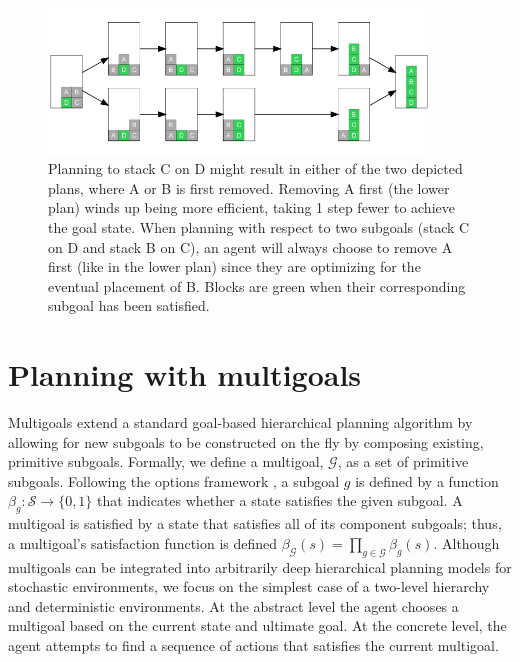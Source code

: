 \documentclass[10pt,letterpaper]{article}
\begin{document}
\begin{figure}[ht]
    \centering
    \includegraphics[width=0.9\textwidth]{example-4-block.png}
    \caption{Planning to stack C on D might result in either of the two depicted plans, where A or B is first removed. Removing A first (the lower plan) winds up being more efficient, taking 1 step fewer to achieve the goal state. When planning with respect to two subgoals (stack C on D and stack B on C), an agent will always choose to remove A first (like in the lower plan) since they are optimizing for the eventual placement of B. Blocks are green when their corresponding subgoal has been satisfied.}
\end{figure}



\section{Planning with multigoals}
\newcommand{\multigoal}{\mathcal{G}}

Multigoals extend a standard goal-based hierarchical planning algorithm by allowing for new subgoals to be constructed on the fly by composing existing, primitive subgoals. Formally, we define a multigoal,  $\multigoal$, as a set of primitive subgoals. Following the options framework \citep{sutton1999between}, a subgoal $g$ is defined by a function 
$\beta_g: \mathcal{S} \rightarrow \{0, 1\}$
that indicates whether a state satisfies the given subgoal. A multigoal is satisfied by a state that satisfies all of its component subgoals; thus, a multigoal's satisfaction function is defined
$\beta_{\multigoal}(s) = \prod_{g \in \multigoal} \beta_g(s)$. Although multigoals can be integrated into arbitrarily deep hierarchical planning models for stochastic environments, we focus on the simplest case of a two-level hierarchy and deterministic environments. At the abstract level the agent chooses a multigoal based on the current state and ultimate goal. At the concrete level, the agent attempts to find a sequence of actions that satisfies the current multigoal.
\end{document}

